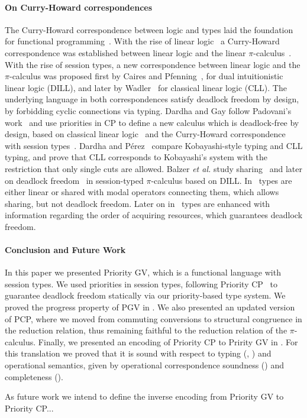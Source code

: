 \documentclass[main.tex]{subfiles}
\begin{document}
\paragraph{On Curry-Howard correspondences}
The Curry-Howard correspondence between logic and types laid the foundation for functional programming~\cite{wadler15}. With the rise of linear logic~\cite{girard87} a Curry-Howard correspondence was established between linear logic and the linear $\pi$-calculus~\cite{abramsky94,bellinscott94}. With the rise of session types, a new correspondence between linear logic and the $\pi$-calculus was proposed first by Caires and Pfenning~\cite{cairespfenning10}, for dual intuitionistic linear logic (DILL), and later by Wadler~\cite{wadler15} for classical linear logic (CLL). The underlying language in both correspondences satisfy deadlock freedom by design, by forbidding cyclic connections via typing. Dardha and Gay follow Padovani's work~\cite{padovani14} and use priorities in CP to define a new calculus which is deadlock-free by design, based on classical linear logic~\cite{girard87}  and the Curry-Howard correspondence with session types~\cite{wadler15}. Dardha and P\'{e}rez~\cite{dardhaperez15} compare Kobayashi-style typing and CLL typing, and prove that CLL corresponds to Kobayashi's system with the restriction that only single cuts are allowed. Balzer \emph{et al.} study sharing~\cite{balzerpfenning17} and later on deadlock freedom~\cite{balzertoninho19} in session-typed $\pi$-calculus based on DILL. In~\cite{balzerpfenning17} types are either linear or shared with modal operators connecting them, which allows sharing, but not deadlock freedom. Later on in~\cite{balzertoninho19} types are enhanced with information regarding the order of acquiring resources, which guarantees deadlock freedom.

\paragraph{Conclusion and Future Work}
In this paper we presented Priority GV, which is a functional language with session types. We used priorities in session types, following Priority CP~\cite{dardhagay18} to guarantee deadlock freedom statically via our priority-based type system. We proved the progress property of PGV in . We also presented an updated version of PCP, where we moved from commuting conversions to structural congruence in the reduction relation, thus remaining faithful to the reduction relation of the $\pi$-calculus. Finally, we presented an encoding of Priority CP to Pririty GV in . For this translation we proved that it is sound with respect to typing (, ) and operational semantics, given by operational correspondence soundness () and completeness ().

As future work we intend to define the inverse encoding from Priority GV to Priority CP...
\end{document}
